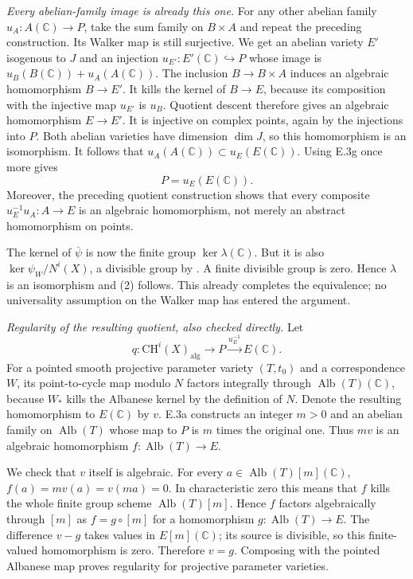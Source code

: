\emph{Every abelian-family image is already this one.}
For any other abelian family $u_A:A(\mathbb C)\to P$, take
the sum family on $B\times A$ and repeat the preceding
construction. Its Walker map is still surjective. We get an
abelian variety $E'$ isogenous to $J$ and an injection
$u_{E'}:E'(\mathbb C)\hookrightarrow P$ whose image is
$u_B(B(\mathbb C))+u_A(A(\mathbb C))$.
The inclusion $B\to B\times A$ induces an algebraic
homomorphism $B\to E'$. It kills the kernel of $B\to E$,
because its composition with the injective map $u_{E'}$
is $u_B$. Quotient descent therefore gives an algebraic
homomorphism $E\to E'$. It is injective on complex points,
again by the injections into $P$. Both abelian varieties have
dimension $\dim J$, so this homomorphism is an isomorphism.
It follows that $u_A(A(\mathbb C))\subset u_E(E(\mathbb C))$.
Using E.3g once more gives
\[
                         P=u_E(E(\mathbb C)).
\]
Moreover, the preceding quotient construction shows that
every composite $u_E^{-1}u_A:A\to E$ is an algebraic
homomorphism, not merely an abstract homomorphism on points.

The kernel of $\overline\psi$ is now the finite group
$\ker\lambda(\mathbb C)$. But it is also
$\ker\psi_W/N^i(X)$, a divisible group by
\citet[Theorem 2.3, author p.~12]{cyACMVWalker2022}.
A finite divisible group is zero. Hence $\lambda$ is an
isomorphism and (2) follows. This already completes the
equivalence; no universality assumption on the Walker map
has entered the argument.

\emph{Regularity of the resulting quotient, also checked directly.}
Let
\[
 q:\mathrm{CH}^i(X)_{\mathrm{alg}}\longrightarrow P
                       \xrightarrow{u_E^{-1}}E(\mathbb C).
\]
For a pointed smooth projective parameter variety $(T,t_0)$
and a correspondence $W$, its point-to-cycle map modulo $N$
factors integrally through $\operatorname{Alb}(T)(\mathbb C)$,
because $W_*$ kills the Albanese kernel by the definition of
$N$. Denote the resulting homomorphism to $E(\mathbb C)$ by
$v$. E.3a constructs an integer $m>0$ and an abelian family
on $\operatorname{Alb}(T)$ whose map to $P$ is $m$ times
the original one. Thus $mv$ is an algebraic homomorphism
$f:\operatorname{Alb}(T)\to E$.

We check that $v$ itself is algebraic. For every
$a\in\operatorname{Alb}(T)[m](\mathbb C)$,
$f(a)=mv(a)=v(ma)=0$. In characteristic zero this means
that $f$ kills the whole finite group scheme
$\operatorname{Alb}(T)[m]$. Hence $f$ factors algebraically
through $[m]$ as $f=g\circ[m]$ for a homomorphism
$g:\operatorname{Alb}(T)\to E$. The difference $v-g$ takes
values in $E[m](\mathbb C)$; its source is divisible, so this
finite-valued homomorphism is zero. Therefore $v=g$.
Composing with the pointed Albanese map proves regularity
for projective parameter varieties.

